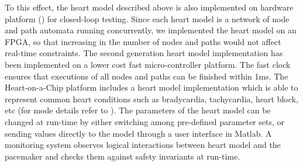To this effect, the heart model described above is also implemented on hardware platform () for closed-loop testing. Since each heart model is a network of node and path automata running concurrently, we implemented the heart model on an FPGA, so that increasing in the number of nodes and paths would not affect real-time constraints. The second generation heart model implementation has been implemented on a lower cost fast micro-controller platform. The fast clock ensures that executions of all nodes and paths can be finished within 1ms. The Heart-on-a-Chip platform includes a heart model implementation which is able to represent common heart conditions such as bradycardia, tachycardia, heart block, etc (for mode details refer to \cite{VHM_proc}). The parameters of the heart model can be changed at run-time by either switching among pre-defined parameter sets, or sending values directly to the model through a user interface in Matlab. A monitoring system observes logical interactions between heart model and the pacemaker and checks them against safety invariants at run-time. 

